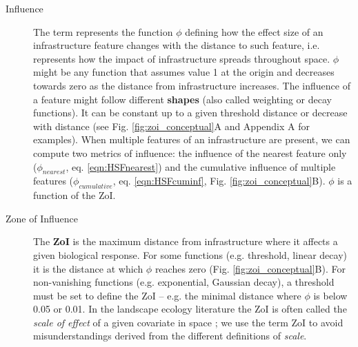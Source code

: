 \documentclass[titlepage]{article}
\begin{document}
\begin{tcolorbox}[width=1.3\textwidth,center,colback=yellow!5,colframe=yellow!75!black,title={Box 1 -- Definitions}]
\begin{description}
    \item[Influence] The term represents the function $\phi$ defining how the effect size of an infrastructure feature changes with the distance to such feature, i.e. represents how the impact of infrastructure spreads throughout space. $\phi$ might be any function that assumes value 1 at the origin and decreases towards zero as the distance from infrastructure increases. The influence of a feature might follow different \textbf{shapes} (also called weighting or decay functions). It can be constant up to a given threshold distance or decrease with distance (see Fig. \ref{fig:zoi_conceptual}A and Appendix A for examples). When multiple features of an infrastructure are present, we can compute two metrics of influence: the influence of the nearest feature only ($\phi_{nearest}$, eq. \ref{eqn:HSFnearest}) and the cumulative influence of multiple features ($\phi_{cumulative}$, eq. \ref{eqn:HSFcuminf}, Fig. \ref{fig:zoi_conceptual}B).
    $\phi$ is a function of the ZoI.
    
    \item[Zone of Influence] The \textbf{ZoI} is the maximum distance from infrastructure where it affects a given biological response. For some functions (e.g. threshold, linear decay) it is the distance at which $\phi$ reaches zero (Fig. \ref{fig:zoi_conceptual}B). For non-vanishing functions (e.g. exponential, Gaussian decay), a threshold must be set to define the ZoI -- e.g. the minimal distance where $\phi$ is below 0.05 or 0.01. 
    In the landscape ecology literature the ZoI is often called the \textit{scale of effect} of a given covariate in space \citep[e.g.][]{jackson_are_2015}; we use the term ZoI to avoid misunderstandings derived from the different definitions of \textit{scale}. 
    

\end{description}
\end{tcolorbox}
\end{document}

